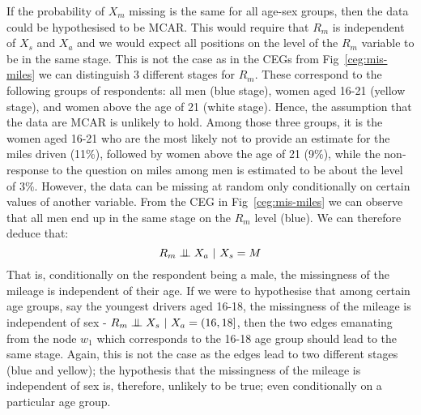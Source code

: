 \documentclass[runningheads]{llncs}
\newcommand{\ind}{\perp\mkern-9.5mu\perp}
\begin{document}
If the probability of $X_m$ missing is the same for all age-sex groups, then the data could be hypothesised to be MCAR. This would require that $R_m$ is independent of $X_s$ and $X_a$ and we would expect all positions on the level of the $R_m$ variable to be in the same stage. 
This is not the case as in the CEGs from Fig~\ref{ceg:mis-miles} we can distinguish 3 different 
stages for $R_m$. These correspond to the following groups of respondents: 
all men (blue stage), women aged 16-21 (yellow stage), and women above the age of 21 (white stage).
Hence, the assumption that the data are MCAR is unlikely to hold. Among those three groups, it is the women aged 16-21 who are the most likely not to provide an estimate for the miles driven (11\%), followed by women above the age of 21 (9\%), while the non-response to the question on miles among men is estimated to be about the level of 3\%. However, the data can be missing at random only conditionally on certain values of another variable. 
From the CEG in Fig~\ref{ceg:mis-miles} we can observe that all men end up in the same stage on the $R_m$ level (blue). We can therefore deduce that:
\[R_m \ind X_a \ | \ X_s = M\]
That is, conditionally on the respondent being a male, the missingness of the mileage is independent of their age. If we were to hypothesise that among certain age groups, say the youngest drivers aged 16-18, the missingness of the mileage is independent of sex - $R_m \ind  X_s \ | \ X_a = (16,18]$, then the two edges emanating from the node $w_1$ which corresponds to the 16-18 age group should lead to the same stage. Again, this is not the case as the edges lead to two different stages (blue and yellow); the hypothesis that the missingness of the mileage is independent of sex is, therefore, unlikely to be true; even conditionally on a particular age group.
\end{document}
